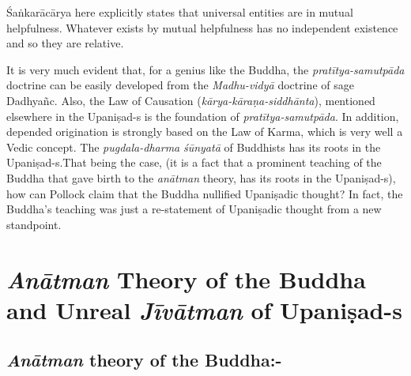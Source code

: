 Śaṅkarācārya here explicitly states that universal entities are in mutual helpfulness. Whatever exists by mutual helpfulness has no independent existence and so they are relative.

It is very much evident that, for a genius like the Buddha, the \textit{pratītya-samutpāda} doctrine can be easily developed from the \textit{Madhu-vidyā} doctrine of sage Dadhyañc. Also, the Law of Causation (\textit{kārya-kāraṇa-siddhānta}), mentioned elsewhere in the Upaniṣad-s is the foundation of \textit{pratītya-samutpāda}. In addition, depended origination is strongly based on the Law of Karma, which is very well a Vedic concept. The \textit{pugdala-dharma} \textit{śūnyatā} of Buddhists has its roots in the Upaniṣad-s.\break That being the case, (it is a fact that a prominent teaching of the Buddha that gave birth to the \textit{anātman} theory, has its roots in the Upaniṣad-s), how can Pollock claim that the Buddha nullified Upaniṣadic thought? In fact, the Buddha’s teaching was just a re-statement of Upaniṣadic thought from a new standpoint.

\vspace{-.3cm}

\section*{\textit{Anātman} Theory of the Buddha \hfill\break and Unreal \textit{Jīvātman} of Upaniṣad-s}

\subsection*{\textit{Anātman} theory of the Buddha:-}

